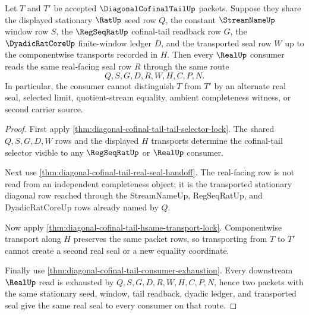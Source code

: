 \begin{theorem}
\label{thm:diagonal-cofinal-tail-stationary-seal-uniqueness}
Let $T$ and $T'$ be accepted $\DiagonalCofinalTailUp$ packets. Suppose they share the displayed stationary $\RatUp$ seed row $Q$, the constant $\StreamNameUp$ window row $S$, the $\RegSeqRatUp$ cofinal-tail readback row $G$, the $\DyadicRatCoreUp$ finite-window ledger $D$, and the transported seal row $W$ up to the componentwise transports recorded in $H$. Then every $\RealUp$ consumer reads the same real-facing seal row $R$ through the same route
$$
Q,S,G,D,R,W,H,C,P,N.
$$
In particular, the consumer cannot distinguish $T$ from $T'$ by an alternate real seal, selected limit, quotient-stream equality, ambient completeness witness, or second carrier source.
\end{theorem}
\begin{proof}
First apply \autoref{thm:diagonal-cofinal-tail-tail-selector-lock}. The shared $Q,S,G,D,W$ rows and the displayed $H$ transports determine the cofinal-tail selector visible to any $\RegSeqRatUp$ or $\RealUp$ consumer.

Next use \autoref{thm:diagonal-cofinal-tail-real-seal-handoff}. The real-facing row is not read from an independent completeness object; it is the transported stationary diagonal row reached through the StreamNameUp, RegSeqRatUp, and DyadicRatCoreUp rows already named by $Q$.

Now apply \autoref{thm:diagonal-cofinal-tail-hsame-transport-lock}. Componentwise transport along $H$ preserves the same packet rows, so transporting from $T$ to $T'$ cannot create a second real seal or a new equality coordinate.

Finally use \autoref{thm:diagonal-cofinal-tail-consumer-exhaustion}. Every downstream $\RealUp$ read is exhausted by $Q,S,G,D,R,W,H,C,P,N$, hence two packets with the same stationary seed, window, tail readback, dyadic ledger, and transported seal give the same real seal to every consumer on that route.
\end{proof}

